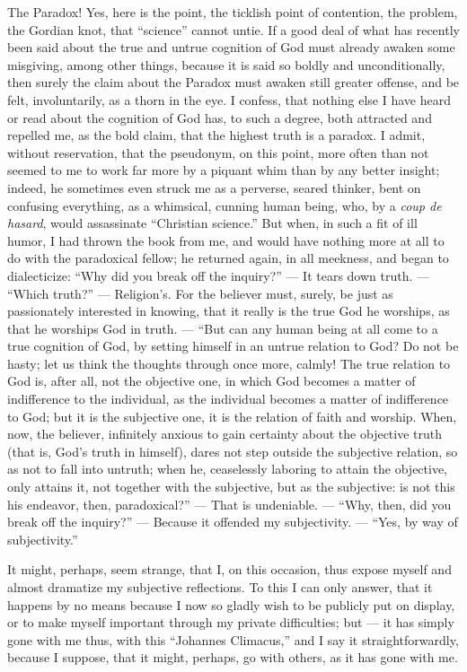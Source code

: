 \documentclass[12pt]{book}
\begin{document}
The Paradox! Yes, here is the point, the ticklish point of contention, the problem, the Gordian knot, that ``science'' cannot untie. If a good deal of what has recently been said about the true and untrue cognition of God must already awaken some misgiving, among other things, because it is said so boldly and unconditionally, then surely the claim about the Paradox must awaken still greater offense, and be felt, involuntarily, as a thorn in the eye. I confess, that nothing else I have heard or read about the cognition of God has, to such a degree, both attracted and repelled me, as the bold claim, that the highest truth is a paradox. I admit, without reservation, that the pseudonym, on this point, more often than not seemed to me to work far more by a piquant whim than by any better insight; indeed, he sometimes even struck me as a perverse, seared thinker, bent on confusing everything, as a whimsical, cunning human being, who, by a \textit{coup de hasard}, would assassinate ``Christian science.'' But when, in such a fit of ill humor, I had thrown the book from me, and would have nothing more at all to do with the paradoxical fellow; he returned again, in all meekness, and began to dialecticize: ``Why did you break off the inquiry?'' --- It tears down truth. --- ``Which truth?'' --- Religion's. For the believer must, surely, be just as passionately interested in knowing, that it really is the true God he worships, as that he worships God in truth. ---
``But can any human being at all come to a true cognition of God, by setting himself in an untrue relation to God? Do not be hasty; let us think the thoughts through once more, calmly! The true relation to God is, after all, not the objective one, in which God becomes a matter of indifference to the individual, as the individual becomes a matter of indifference to God; but it is the subjective one, it is the relation of faith and worship. When, now, the believer, infinitely anxious to gain certainty about the objective truth (that is, God's truth in himself), dares not step outside the subjective relation, so as not to fall into untruth; when he, ceaselessly laboring to attain the objective, only attains it, not together with the subjective, but as the subjective: is not this his endeavor, then, paradoxical?'' --- That is undeniable. --- ``Why, then, did you break off the inquiry?'' --- Because it offended my subjectivity. --- ``Yes, by way of subjectivity.''

It might, perhaps, seem strange, that I, on this occasion, thus expose myself and almost dramatize my subjective reflections. To this I can only answer, that it happens by no means because I now so gladly wish to be publicly put on display, or to make myself important through my private difficulties; but --- it has simply gone with me thus, with this ``Johannes Climacus,'' and I say it straightforwardly, because I suppose, that it might, perhaps, go with others, as it has gone with me.
\end{document}
